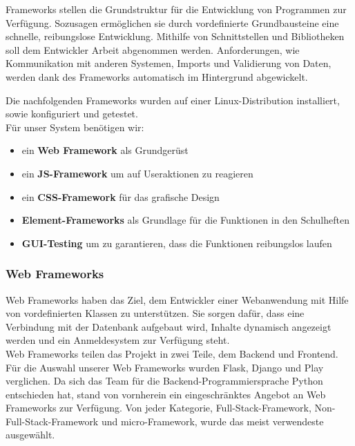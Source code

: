 
Frameworks stellen die Grundstruktur für die Entwicklung von Programmen zur Verfügung. Sozusagen ermöglichen sie durch vordefinierte Grundbausteine eine schnelle, reibungslose Entwicklung. Mithilfe von Schnittstellen und Bibliotheken soll dem Entwickler Arbeit abgenommen werden. Anforderungen, wie Kommunikation mit anderen Systemen, Imports und Validierung von Daten, werden dank des Frameworks automatisch im Hintergrund abgewickelt.

Die nachfolgenden Frameworks wurden auf einer Linux-Distribution installiert, sowie konfiguriert und getestet.\\
Für unser System benötigen wir:
\begin{itemize}
\item ein \textbf{Web Framework} als Grundgerüst
\item ein \textbf{JS-Framework} um auf Useraktionen zu reagieren
\item ein \textbf{\gls{CSS}-Framework} für das grafische Design
\item \textbf{Element-Frameworks} als Grundlage für die Funktionen in den Schulheften
\item \textbf{GUI-Testing} um zu garantieren, dass die Funktionen reibungslos laufen
\end{itemize}

\subsubsection{Web Frameworks}
Web Frameworks haben das Ziel, dem Entwickler einer Webanwendung mit Hilfe von vordefinierten Klassen zu unterstützen. Sie sorgen dafür, dass eine Verbindung mit der Datenbank aufgebaut wird, Inhalte dynamisch angezeigt werden und ein Anmeldesystem zur Verfügung steht.\\
Web Frameworks teilen das Projekt in zwei Teile, dem Backend und Frontend.\\
Für die Auswahl unserer Web Frameworks wurden Flask, Django und Play verglichen. Da sich das Team für die Backend-Programmiersprache Python entschieden hat, stand von vornherein ein eingeschränktes Angebot an Web Frameworks zur Verfügung. Von jeder Kategorie, Full-Stack-Framework, Non-Full-Stack-Framework und micro-Framework, wurde das meist verwendeste ausgewählt. 

